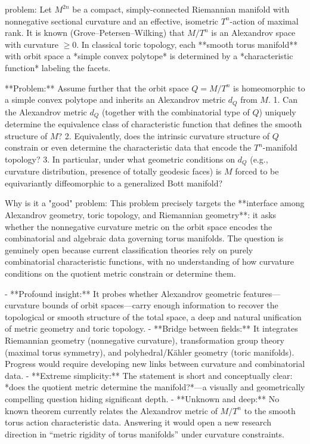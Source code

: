 problem:  
Let \( M^{2n} \) be a compact, simply-connected Riemannian manifold with nonnegative sectional curvature and an effective, isometric \( T^n \)-action of maximal rank. It is known (Grove–Petersen–Wilking) that \( M/T^n \) is an Alexandrov space with curvature \( \ge 0 \). In classical toric topology, each **smooth torus manifold** with orbit space a *simple convex polytope* is determined by a *characteristic function* labeling the facets.  

**Problem:**  
Assume further that the orbit space \( Q = M/T^n \) is homeomorphic to a simple convex polytope and inherits an Alexandrov metric \( d_Q \) from \( M \).  
1. Can the Alexandrov metric \( d_Q \) (together with the combinatorial type of \( Q \)) uniquely determine the equivalence class of characteristic function that defines the smooth structure of \( M \)?  
2. Equivalently, does the intrinsic curvature structure of \( Q \) constrain or even determine the characteristic data that encode the \( T^n \)-manifold topology?  
3. In particular, under what geometric conditions on \( d_Q \) (e.g., curvature distribution, presence of totally geodesic faces) is \( M \) forced to be equivariantly diffeomorphic to a generalized Bott manifold?  

Why is it a "good" problem:  
This problem precisely targets the **interface among Alexandrov geometry, toric topology, and Riemannian geometry**: it asks whether the nonnegative curvature metric on the orbit space encodes the combinatorial and algebraic data governing torus manifolds. The question is genuinely open because current classification theories rely on purely combinatorial characteristic functions, with no understanding of how curvature conditions on the quotient metric constrain or determine them.  

- **Profound insight:** It probes whether Alexandrov geometric features—curvature bounds of orbit spaces—carry enough information to recover the topological or smooth structure of the total space, a deep and natural unification of metric geometry and toric topology.  
- **Bridge between fields:** It integrates Riemannian geometry (nonnegative curvature), transformation group theory (maximal torus symmetry), and polyhedral/Kähler geometry (toric manifolds). Progress would require developing new links between curvature and combinatorial data.  
- **Extreme simplicity:** The statement is short and conceptually clear: *does the quotient metric determine the manifold?*—a visually and geometrically compelling question hiding significant depth.  
- **Unknown and deep:** No known theorem currently relates the Alexandrov metric of \( M/T^n \) to the smooth torus action characteristic data. Answering it would open a new research direction in “metric rigidity of torus manifolds” under curvature constraints.